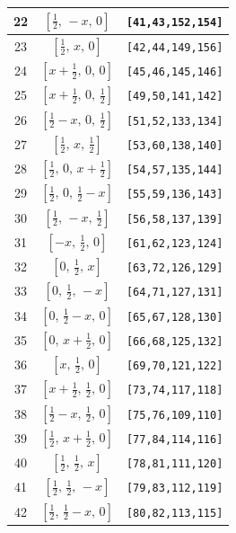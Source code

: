 \documentclass[fleqn,8pt]{jsarticle}
\begin{document}
\begin{longtable}{ccc}
22 & $\left[ \frac{1}{2},\, - x,\, 0 \right]$ & {\tt [41,43,152,154]} \\ \hline
23 & $\left[ \frac{1}{2},\, x,\, 0 \right]$ & {\tt [42,44,149,156]} \\ \hline
24 & $\left[ x + \frac{1}{2},\, 0,\, 0 \right]$ & {\tt [45,46,145,146]} \\ \hline
25 & $\left[ x + \frac{1}{2},\, 0,\, \frac{1}{2} \right]$ & {\tt [49,50,141,142]} \\ \hline
26 & $\left[ \frac{1}{2} - x,\, 0,\, \frac{1}{2} \right]$ & {\tt [51,52,133,134]} \\ \hline
27 & $\left[ \frac{1}{2},\, x,\, \frac{1}{2} \right]$ & {\tt [53,60,138,140]} \\ \hline
28 & $\left[ \frac{1}{2},\, 0,\, x + \frac{1}{2} \right]$ & {\tt [54,57,135,144]} \\ \hline
29 & $\left[ \frac{1}{2},\, 0,\, \frac{1}{2} - x \right]$ & {\tt [55,59,136,143]} \\ \hline
30 & $\left[ \frac{1}{2},\, - x,\, \frac{1}{2} \right]$ & {\tt [56,58,137,139]} \\ \hline
31 & $\left[ - x,\, \frac{1}{2},\, 0 \right]$ & {\tt [61,62,123,124]} \\ \hline
32 & $\left[ 0,\, \frac{1}{2},\, x \right]$ & {\tt [63,72,126,129]} \\ \hline
33 & $\left[ 0,\, \frac{1}{2},\, - x \right]$ & {\tt [64,71,127,131]} \\ \hline
34 & $\left[ 0,\, \frac{1}{2} - x,\, 0 \right]$ & {\tt [65,67,128,130]} \\ \hline
35 & $\left[ 0,\, x + \frac{1}{2},\, 0 \right]$ & {\tt [66,68,125,132]} \\ \hline
36 & $\left[ x,\, \frac{1}{2},\, 0 \right]$ & {\tt [69,70,121,122]} \\ \hline
37 & $\left[ x + \frac{1}{2},\, \frac{1}{2},\, 0 \right]$ & {\tt [73,74,117,118]} \\ \hline
38 & $\left[ \frac{1}{2} - x,\, \frac{1}{2},\, 0 \right]$ & {\tt [75,76,109,110]} \\ \hline
39 & $\left[ \frac{1}{2},\, x + \frac{1}{2},\, 0 \right]$ & {\tt [77,84,114,116]} \\ \hline
40 & $\left[ \frac{1}{2},\, \frac{1}{2},\, x \right]$ & {\tt [78,81,111,120]} \\ \hline
41 & $\left[ \frac{1}{2},\, \frac{1}{2},\, - x \right]$ & {\tt [79,83,112,119]} \\ \hline
42 & $\left[ \frac{1}{2},\, \frac{1}{2} - x,\, 0 \right]$ & {\tt [80,82,113,115]} \\ \hline

\end{longtable}
\end{document}
